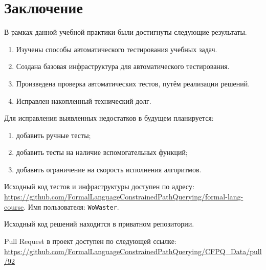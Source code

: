 
\section*{Заключение}
В рамках данной учебной практики были достигнуты следующие результаты.
\begin{enumerate}
    \item Изучены способы автоматического тестирования учебных задач.
    \item Создана базовая инфраструктура для автоматического тестирования.
    \item Произведена проверка автоматических тестов, путём реализации решений.
    \item Исправлен накопленный технический долг.
\end{enumerate}

Для исправления выявленных недостатков в будущем планируется:
\begin{enumerate}
    \item добавить ручные тесты;
    \item добавить тесты на наличие вспомогательных функций;
    \item добавить ограничение на скорость исполнения алгоритмов.
\end{enumerate}

Исходный код тестов и инфраструктуры доступен по адресу: \url{https://github.com/FormalLanguageConstrainedPathQuerying/formal-lang-course}.
Имя пользователя: \texttt{WoWaster}.

Исходный код решений находится в приватном репозитории.

Pull Request в проект \cfpqdata{} доступен по следующей ссылке: \url{https://github.com/FormalLanguageConstrainedPathQuerying/CFPQ_Data/pull/92}
